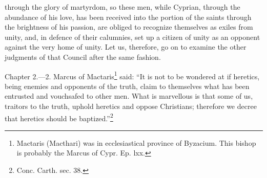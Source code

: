 through the glory of martyrdom, so these men, while Cyprian, through the abundance of his love, has been received into the portion of the saints through the brightness of his passion, are obliged to recognize themselves as exiles from unity, and, in defence of their calumnies, set up a citizen of unity as an opponent against the very home of unity. Let us, therefore, go on to examine the other judgments of that Council after the same fashion.


Chapter 2.—2. Marcus of Mactaris\footnote{\par  Mactaris (Macthari) was in ecclesiastical province of Byzacium. This bishop is probably the Marcus of Cypr. Ep. lxx.} said: ``It is not to be wondered at if heretics, being enemies and opponents of the truth, claim to themselves what has been entrusted and vouchsafed to other men. What is marvellous is that some of us, traitors to the truth, uphold heretics and oppose Christians; therefore we decree that heretics should be baptized.''\footnote{\par  Conc. Carth. sec. 38.}


